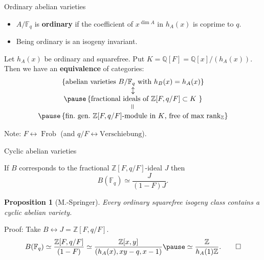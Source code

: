 \documentclass[usenames,dvipsnames,handout]{beamer}
\def\Q{\mathbb{Q}}
\def\Z{\mathbb{Z}}
\def\F{\mathbb{F}}
\DeclareMathOperator{\Frob}{Frob}
\newcommand{\set}[1]{\left\lbrace#1\right\rbrace }
\newtheorem{prop}[df]{Proposition}
\begin{document}
\begin{frame}{ Ordinary abelian varieties }
	\begin{itemize}
        \item $A/\F_q$ is {\bf ordinary} if
         the coefficient of $x^{\dim A}$ in $h_A(x)$ is coprime to $q$.
        \pause
        \item Being ordinary is an isogeny invariant.
	\end{itemize}
    \pause
    \begin{theorem}[Deligne]
        Let $h_A(x)$ be ordinary and squarefree.
        \pause
        Put $K=\Q[F]=\Q[x]/(h_A(x))$.\\
        \pause
        Then we have an {\bf equivalence} of categories:
        \[\begin{array}{c}
        \set{\text{abelian varieties $B/\F_q$ with $h_B(x)=h_A(x)$}}\\
        \updownarrow \\
        \pause
        \set{ \text{fractional ideals of $\Z[F,q/F]\subset K$ } }\\
        \rotatebox{90}{=}\\
        \pause
        \set{{\text{fin.~gen.~$\Z[F,q/F]$-module in $K$, free of max $\mathrm{rank}_\Z$}}}
        \end{array}\]
    \end{theorem}
    \pause Note: $F \leftrightarrow \Frob$ (and $q/F \leftrightarrow \mathrm{Verschiebung}$).
\end{frame}


\begin{frame}{ Cyclic abelian varieties }
    \begin{corollary}
        If $B$ corresponds to the fractional $\Z[F,q/F]$-ideal $J$ then
        \pause
        \[ B(\F_q) \simeq \frac{J}{(1-F)J}.\]
    \end{corollary}
    \pause
    \begin{prop}[M.-Springer]
        Every ordinary squarefree isogeny class contains a cyclic abelian variety.
    \end{prop}
    \pause
	Proof: Take $B\longleftrightarrow J=\Z[F,q/F]$.
    \pause
    \[ B(\F_q)\simeq \frac{\Z[F,q/F]}{(1-F)} \simeq \frac{\Z[x,y]}{(h_A(x),xy-q,x-1)}
    \pause
    \simeq \frac{\Z}{h_A(1)\Z}.\qed \]
\end{frame}
\end{document}
